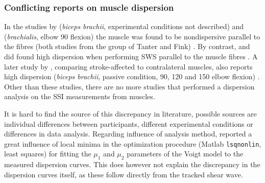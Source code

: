 \subsubsection{Conflicting reports on muscle dispersion}
In the studies by \citeauthor{deffieux_shear_2009} (\textit{biceps brachii}, experimental conditions not described) and \citeauthor{gennisson_viscoelastic_2010} (\textit{brachialis}, elbow \SI{90}{\deg} flexion) the muscle was found to be nondispersive parallel to the fibres (both studies from the group of Tanter and Fink) \cite{deffieux_shear_2009, gennisson_viscoelastic_2010}. By contrast, \citeauthor{rasool_altered_2016} and \citeauthor{saadat_frequency_2018} did found high dispersion when performing SWS parallel to the muscle fibres \cite{rasool_altered_2016, saadat_frequency_2018}. A later study by \citeauthor{rasool_shear_2018}, comparing stroke-affected to contralateral muscles, also reports high dispersion (\textit{biceps brachii}, passive condition, 90, 120 and 150 \si{\deg} elbow flexion) \cite{rasool_shear_2018}. Other than these studies, there are no more studies that performed a dispersion analysis on the SSI measurements from muscles. 

It is hard to find the source of this discrepancy in literature, possible sources are individual differences between participants, different experimental conditions or differences in data analysis. Regarding influence of analysis method, \citet{rasool_shear_2018} reported a great influence of local minima in the optimization procedure (Matlab \texttt{lsqnonlin}, least squares) for fitting the $\mu_1$ and $\mu_2$ parameters of the Voigt model to the measured dispersion curves. This does however not explain the discrepancy in the dispersion curves itself, as these follow directly from the tracked shear wave. %



